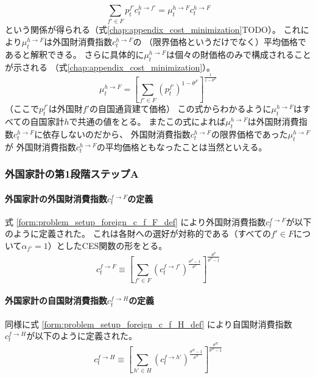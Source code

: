 \begin{equation}
\label{form:chapter3_households_stage1a_home_c_h_F_problem_mu_h_F_average_eq}
    \sum_{f'\in F}p_t^{f'}c_t^{h\to f'}=\mu_t^{h\to F}c_t^{h\to F}
\end{equation}
という関係が得られる（式\eqref{chap:appendix_cost_minimization}TODO）。
これにより\(\mu_t^{h\to F}\)は外国財消費指数\(c_t^{h\to F}\)の
（限界価格というだけでなく）平均価格であると解釈できる。
さらに具体的に\(\mu_t^{h\to F}\)は個々の財価格のみで構成されることが示される
（式\eqref{chap:appendix_cost_minimization}）。
\begin{equation}
\label{form:chapter3_households_stage1a_home_c_h_F_problem_mu_h_F_eq}
    \mu_t^{h\to F}=\left[\sum_{f'\in F}(p_t^{f'})^{1-\theta^F}\right]^{\frac{1}{1-\theta^F}}
\end{equation}
（ここで\(p_t^{f'}\)は外国財\(f'\)の自国通貨建て価格）
この式からわかるように\(\mu_t^{h\to F}\)はすべての自国家計\(h\)で共通の値をとる。
またこの式によれば\(\mu_t^{h\to F}\)は外国財消費指数\(c_t^{h\to F}\)に依存しないのだから、
外国財消費指数\(c_t^{h\to F}\)の限界価格であった\(\mu_t^{h\to F}\)が
外国財消費指数\(c_t^{h\to F}\)の平均価格ともなったことは当然といえる。

\subsubsection{外国家計の第1段階ステップA}
\label{sec:chapter3_households_stage1a_foreign}

\paragraph{外国家計の外国財消費指数\(c_t^{f\to F}\)の定義}
\label{sec:chapter3_households_stage1a_foreign_c_f_F_definition}
式
\eqref{form:problem_setup_foreign_c_f_F_def}
により外国財消費指数\(c_t^{f\to F}\)が以下のように定義された。
これは各財への選好が対称的である（すべての\(f'\in F\)について\(\alpha_{f'}=1\)）としたCES関数の形をとる。
\begin{equation}
\label{form:chapter3_households_stage1a_foreign_c_f_F_definition_def}
    c_t^{f\to F}\equiv\left[\sum_{f'\in F}(c_t^{f\to f'})^{\frac{\theta^F-1}{\theta^F}}\right]^{\frac{\theta^F}{\theta^F-1}}
\end{equation}

\paragraph{外国家計の自国財消費指数\(c_t^{f\to H}\)の定義}
\label{sec:chapter3_households_stage1a_foreign_c_f_H_definition}
同様に式
\eqref{form:problem_setup_foreign_c_f_H_def}
により自国財消費指数\(c_t^{f\to H}\)が以下のように定義された。
\begin{equation}
\label{form:chapter3_households_stage1a_foreign_c_f_H_definition_def}
    c_t^{f\to H}\equiv\left[\sum_{h'\in H}(c_t^{f\to h'})^{\frac{\theta^H-1}{\theta^H}}\right]^{\frac{\theta^H}{\theta^H-1}}
\end{equation}

